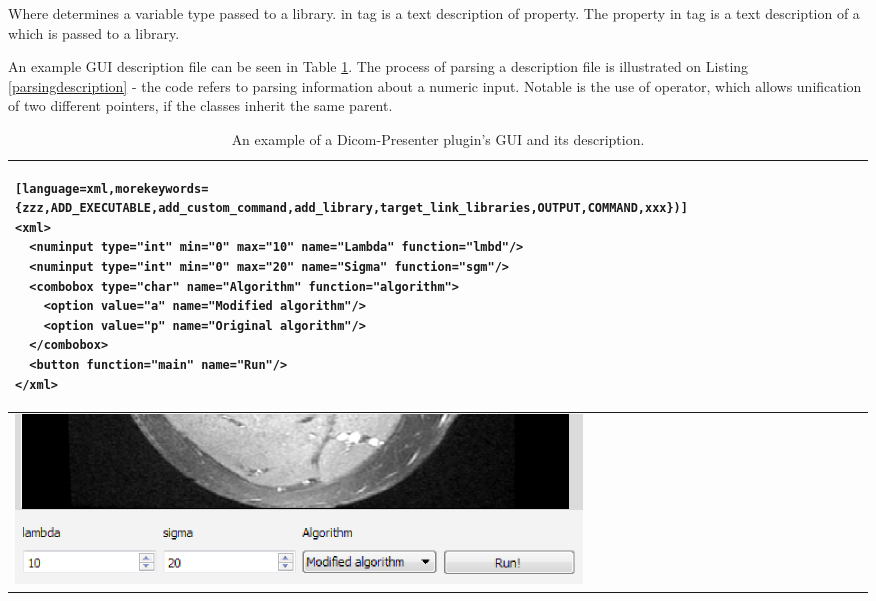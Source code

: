 Where  determines a variable type passed to a library.  in  tag is a text description of property. The  property in  tag is a text description of a  which is passed to a library.

An example GUI description file can be seen in Table \ref{tab:exampledescription}. The process of parsing a description file is illustrated on Listing \ref{parsingdescription} - the code refers to parsing information about a numeric input. Notable is the use of  operator, which allows unification of two different pointers, if the classes inherit the same parent.

\lstset{numbers=none,frame=none}

\begin{table}[ht]
	\caption{An example of a Dicom-Presenter plugin's GUI and its description.\label{tab:exampledescription}}
	\begin{tabular}{|m{\textwidth}|}
	\hline
\begin{lstlisting}[language=xml,morekeywords={zzz,ADD_EXECUTABLE,add_custom_command,add_library,target_link_libraries,OUTPUT,COMMAND,xxx})]
<xml>
  <numinput type="int" min="0" max="10" name="Lambda" function="lmbd"/>
  <numinput type="int" min="0" max="20" name="Sigma" function="sgm"/>
  <combobox type="char" name="Algorithm" function="algorithm">
    <option value="a" name="Modified algorithm"/>
    <option value="p" name="Original algorithm"/>
  </combobox>
  <button function="main" name="Run"/>
</xml>
\end{lstlisting}
		\\
		  \hline		
		  \noalign{\smallskip}
			\includegraphics[width=\textwidth]{Text/IMG/Plugins.png}
		\\
		\hline
		\end{tabular}
\end{table}%

\lstset{numbers=left,frame=single,}

